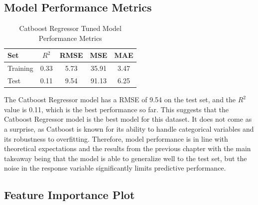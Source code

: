 \subsection{Model Performance Metrics}
\begin{table}[H]
    \centering
    \caption{Catboost Regressor Tuned Model Performance Metrics}
    \label{tab:catboost_regressor_performance}
    \begin{tabular}{lcccc}
    \hline
    Set & $R^2$ & RMSE & MSE & MAE \\ 
    \hline
    Training & 0.33 & 5.73 & 35.91 & 3.47 \\
    Test & 0.11 & 9.54 & 91.13 & 6.25 \\
    \hline
    \end{tabular}
\end{table}
\noindent The Catboost Regressor model has a RMSE of 9.54 on the test set, and the $R^2$ value is 0.11, which is the best performance so far. This suggests that the Catboost Regressor model is the best model for this dataset. It does not come as a surprise, as Catboost is known for its ability to handle categorical variables and its robustness to overfitting. Therefore, model performance is in line with theoretical expectations and the results from the previous chapter with the main takeaway being that the model is able to generalize well to the test set, but the noise in the response variable significantly limits predictive performance.


    

\subsection{Feature Importance Plot}

